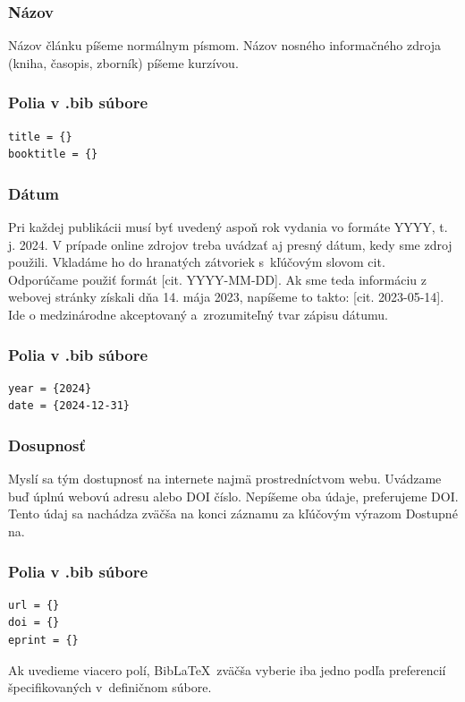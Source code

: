 \subsubsection*{Názov}
Názov článku píšeme normálnym písmom.
Názov nosného informačného zdroja (kniha, časopis, zborník) píšeme kurzívou.

\subsubsection*{\normalsize Polia v .bib súbore}
\begin{verbatim}
title = {}
booktitle = {}
\end{verbatim}

\subsubsection*{Dátum}
Pri každej publikácii musí byť uvedený aspoň rok vydania
vo formáte YYYY, t. j. 2024.
V prípade online zdrojov treba uvádzať aj presný dátum,
kedy sme zdroj použili.
Vkladáme ho do hranatých zátvoriek s~kľúčovým slovom cit. 
Odporúčame použiť formát [cit. YYYY-MM-DD].
Ak sme teda informáciu z webovej stránky získali dňa
14. mája 2023,
napíšeme to takto: [cit. 2023-05-14].
Ide o medzinárodne akceptovaný a~zrozumiteľný tvar zápisu dátumu.

\subsubsection*{\normalsize Polia v .bib súbore}
\begin{verbatim}
year = {2024}
date = {2024-12-31}
\end{verbatim}

\subsubsection*{Dosupnosť}
Myslí sa tým dostupnosť na internete najmä prostredníctvom webu. 
Uvádzame buď úplnú webovú adresu alebo DOI číslo.
Nepíšeme oba údaje, preferujeme DOI.
Tento údaj sa nachádza zväčša na konci záznamu za kľúčovým výrazom Dostupné na.

\subsubsection*{\normalsize Polia v .bib súbore}
\begin{verbatim}
url = {}
doi = {}
eprint = {}
\end{verbatim}
Ak uvedieme viacero polí, Bib\LaTeX\ zväčša vyberie iba jedno
podľa preferencií špecifikovaných v~definičnom súbore.


